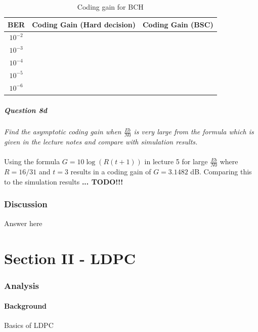 \documentclass[a4paper]{article}
\begin{document}
\begin{table}
\centering
\begin{tabular}{| c | c | c |}
\hline
BER & Coding Gain (Hard decision) & Coding Gain (BSC) \\
\hline
$10^{-2}$ & & \\
\hline
$10^{-3}$ & & \\
\hline
$10^{-4}$ & & \\
\hline
$10^{-5}$ & & \\
\hline
$10^{-6}$ & & \\
\hline

\end{tabular}
\caption{Coding gain for BCH}
\end{table}

\subsubsection{Question 8d} \textit{Find the asymptotic coding gain when $\frac{Eb}{N0}$ is very large from the formula which is given in the lecture notes and compare with simulation results.} \\
\\
Using the formula $G = 10\log(R(t+1))$ in lecture 5 for large $\frac{Eb}{N0}$ where $R = 16/31$ and $t = 3$ results in a coding gain of $G = 3.1482$ dB. Comparing this to the simulation results \textbf{... TODO!!!} \\

\section{Discussion}

Answer here \\


\hrulefill
\newpage

\part*{Section II - LDPC}


\section{Analysis}
\subsection{Background}
Basics of LDPC 
\end{document}
